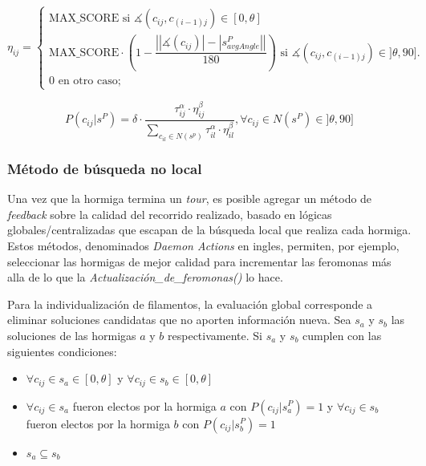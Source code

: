 \begin{equation}
    \eta_{ij} = 
        \begin{cases} 
        \text{MAX\_SCORE si } \measuredangle(c_{ij}, c_{(i-1)j}) \in [0, \theta]\\[3ex]
        
        \text{MAX\_SCORE} \cdot \left(1 - \dfrac{ \left| |\measuredangle(c_{ij})| - |s^{P}_{avgAngle}| \right|} {180} \right)  \text{ si } \measuredangle(c_{ij}, c_{(i-1)j}) \in ]\theta, 90].\\[3ex]
        
        \text{0 en otro caso;}
        \end{cases}
    \label{eq:heuristicaMiope}
\end{equation}

\begin{equation}
P(c_{ij} | s^{P}) = \delta \cdot \frac
        {\tau_{ij}^{\alpha} \cdot \eta_{ij}^{\beta}}
        {\sum\limits_{c_{il}\in N(s^p)}{\tau_{il}^{\alpha} \cdot \eta_{il}^{\beta} } }, \forall c_{ij} \in N(s^{P}) \in ]\theta, 90]
    \label{eq:antProbInterQua}
\end{equation}
    
\subsubsection{M\'etodo de b\'usqueda no local}
Una vez que la hormiga termina un {\it tour}, es posible agregar un m\'etodo de {\it feedback} sobre la calidad del recorrido realizado, basado en l\'ogicas globales/centralizadas que escapan de la b\'usqueda local que realiza cada hormiga. Estos m\'etodos, denominados {\it Daemon Actions} en ingles, permiten, por ejemplo, seleccionar las hormigas de mejor calidad para incrementar las feromonas m\'as alla de lo que la {\it Actualizaci\'on\_de\_feromonas()} lo hace. 

Para la individualizaci\'on de filamentos, la evaluaci\'on global corresponde a eliminar soluciones candidatas que no aporten informaci\'on nueva. Sea $s_a$ y $s_b$ las soluciones de las hormigas $a$ y $b$ respectivamente. Si $s_a$ y $s_b$ cumplen con las siguientes condiciones:

\begin{itemize}
    \item $\forall c_{ij} \in s_a \in [0, \theta]$ y $\forall c_{ij} \in s_b \in [0, \theta]$
    \item $\forall c_{ij} \in s_a$ fueron electos por la hormiga $a$ con $P(c_{ij} | s_{a}^{P}) = 1$ y $\forall c_{ij} \in s_b$ fueron electos por la hormiga $b$ con $P(c_{ij} | s_{b}^{P}) = 1$
    \item $s_a \subseteq s_b$
\end{itemize}

